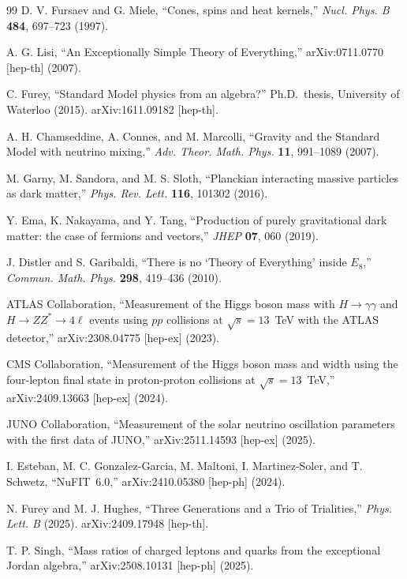 \documentclass[12pt,a4paper]{article}
\theoremstyle{definition}
\begin{document}
\begin{thebibliography}{99}
D. V. Fursaev and G. Miele, ``Cones, spins and heat kernels,'' \textit{Nucl. Phys. B} \textbf{484}, 697--723 (1997).

A. G. Lisi, ``An Exceptionally Simple Theory of Everything,'' arXiv:0711.0770 [hep-th] (2007).

C. Furey, ``Standard Model physics from an algebra?'' Ph.D.\ thesis, University of Waterloo (2015). arXiv:1611.09182 [hep-th].

A. H. Chamseddine, A. Connes, and M. Marcolli, ``Gravity and the Standard Model with neutrino mixing,'' \textit{Adv. Theor. Math. Phys.} \textbf{11}, 991--1089 (2007).

M. Garny, M. Sandora, and M. S. Sloth, ``Planckian interacting massive particles as dark matter,'' \textit{Phys. Rev. Lett.} \textbf{116}, 101302 (2016).

Y. Ema, K. Nakayama, and Y. Tang, ``Production of purely gravitational dark matter: the case of fermions and vectors,'' \textit{JHEP} \textbf{07}, 060 (2019).

J. Distler and S. Garibaldi, ``There is no `Theory of Everything' inside $E_8$,'' \textit{Commun. Math. Phys.} \textbf{298}, 419--436 (2010).

ATLAS Collaboration, ``Measurement of the Higgs boson mass with $H \to \gamma\gamma$ and $H \to ZZ^* \to 4\ell$ events using $pp$ collisions at $\sqrt{s} = 13$~TeV with the ATLAS detector,'' arXiv:2308.04775 [hep-ex] (2023).

CMS Collaboration, ``Measurement of the Higgs boson mass and width using the four-lepton final state in proton-proton collisions at $\sqrt{s} = 13$~TeV,'' arXiv:2409.13663 [hep-ex] (2024).

JUNO Collaboration, ``Measurement of the solar neutrino oscillation parameters with the first data of JUNO,'' arXiv:2511.14593 [hep-ex] (2025).

I. Esteban, M. C. Gonzalez-Garcia, M. Maltoni, I. Martinez-Soler, and T. Schwetz, ``NuFIT~6.0,'' arXiv:2410.05380 [hep-ph] (2024).

N. Furey and M. J. Hughes, ``Three Generations and a Trio of Trialities,'' \textit{Phys. Lett. B} (2025). arXiv:2409.17948 [hep-th].

T. P. Singh, ``Mass ratios of charged leptons and quarks from the exceptional Jordan algebra,'' arXiv:2508.10131 [hep-ph] (2025).


\end{thebibliography}
\end{document}
